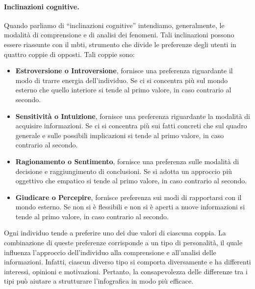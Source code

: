 \paragraph{Inclinazioni cognitive.}
Quando parliamo di ``inclinazioni cognitive'' intendiamo, generalmente, le modalità di comprensione e di analisi dei fenomeni.
Tali inclinazioni possono essere riassunte con il \gls{mbti}, strumento che divide le preferenze degli utenti in quattro coppie di 
opposti. Tali coppie sono:
\begin{itemize}
    \item \textbf{Estroversione o Introversione}, fornisce una preferenza riguardante il modo di trarre energia dell'individuo.
    Se ci si concentra più sul mondo esterno che quello interiore si tende al primo valore, in caso contrario al secondo.   
    \item \textbf{Sensitività o Intuizione}, fornisce una preferenza riguardante la modalità di acquisire informazioni. 
    Se ci si concentra più sui fatti concreti che sul quadro generale e sulle possibili implicazioni si tende al primo valore, in caso contrario al secondo.
    \item \textbf{Ragionamento o Sentimento}, fornisce una preferenza sulle modalità di decisione e raggiungimento di conclusioni.
    Se si adotta un approccio più oggettivo che empatico si tende al primo valore, in caso contrario al secondo.
    \item \textbf{Giudicare o Percepire}, fornisce preferenza sui modi di rapportarsi con il mondo esterno.
    Se non si è flessibili e non si è aperti a nuove informazioni si tende al primo valore, in caso contrario al secondo.
\end{itemize}
Ogni individuo tende a preferire uno dei due valori di ciascuna coppia. La combinazione di queste preferenze corrisponde a un tipo di personalità, il quale influenza l'approccio
dell'individuo alla comprensione e all'analisi delle informazioni. Infatti, ciascun diverso tipo si comporta diversamente e ha differenti interessi, opinioni e motivazioni. 
Pertanto, la consapevolezza delle differenze tra i tipi può aiutare a strutturare l'infografica in modo più efficace.

